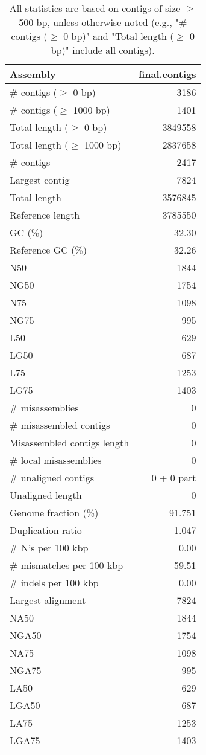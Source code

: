 \documentclass[12pt,a4paper]{article}
\begin{document}
\begin{table}[ht]
\begin{center}
\caption{All statistics are based on contigs of size $\geq$ 500 bp, unless otherwise noted (e.g., "\# contigs ($\geq$ 0 bp)" and "Total length ($\geq$ 0 bp)" include all contigs).}
\begin{tabular}{|l*{1}{|r}|}
\hline
Assembly & final.contigs \\ \hline
\# contigs ($\geq$ 0 bp) & 3186 \\ \hline
\# contigs ($\geq$ 1000 bp) & 1401 \\ \hline
Total length ($\geq$ 0 bp) & 3849558 \\ \hline
Total length ($\geq$ 1000 bp) & 2837658 \\ \hline
\# contigs & 2417 \\ \hline
Largest contig & 7824 \\ \hline
Total length & 3576845 \\ \hline
Reference length & 3785550 \\ \hline
GC (\%) & 32.30 \\ \hline
Reference GC (\%) & 32.26 \\ \hline
N50 & 1844 \\ \hline
NG50 & 1754 \\ \hline
N75 & 1098 \\ \hline
NG75 & 995 \\ \hline
L50 & 629 \\ \hline
LG50 & 687 \\ \hline
L75 & 1253 \\ \hline
LG75 & 1403 \\ \hline
\# misassemblies & 0 \\ \hline
\# misassembled contigs & 0 \\ \hline
Misassembled contigs length & 0 \\ \hline
\# local misassemblies & 0 \\ \hline
\# unaligned contigs & 0 + 0 part \\ \hline
Unaligned length & 0 \\ \hline
Genome fraction (\%) & 91.751 \\ \hline
Duplication ratio & 1.047 \\ \hline
\# N's per 100 kbp & 0.00 \\ \hline
\# mismatches per 100 kbp & 59.51 \\ \hline
\# indels per 100 kbp & 0.00 \\ \hline
Largest alignment & 7824 \\ \hline
NA50 & 1844 \\ \hline
NGA50 & 1754 \\ \hline
NA75 & 1098 \\ \hline
NGA75 & 995 \\ \hline
LA50 & 629 \\ \hline
LGA50 & 687 \\ \hline
LA75 & 1253 \\ \hline
LGA75 & 1403 \\ \hline
\end{tabular}
\end{center}
\end{table}
\end{document}
